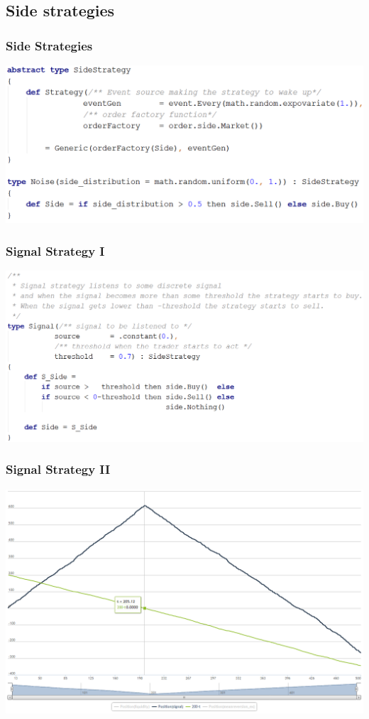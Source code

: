 \documentclass{beamer}
\begin{document}
\subsection{Side strategies}
\begin{frame}
\frametitle{Side Strategies}
\includegraphics[width=1\linewidth]{side_strategy.png}
\end{frame}
\begin{frame}
\frametitle{Signal Strategy I}
\includegraphics[width=1\linewidth]{signal_strategy.png}
\end{frame}
\begin{frame}
\frametitle{Signal Strategy II}
\includegraphics[width=1\linewidth]{signal.png}
\end{frame}
\end{document}
